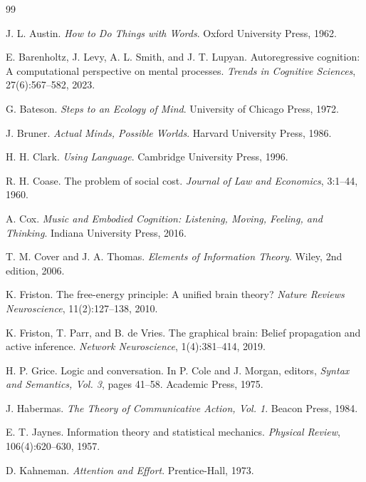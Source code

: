\documentclass[12pt]{article}
\theoremstyle{remark}
\begin{document}
\begin{thebibliography}{99}

J. L. Austin.
\newblock \emph{How to Do Things with Words}.
\newblock Oxford University Press, 1962.

E. Barenholtz, J. Levy, A. L. Smith, and J. T. Lupyan.
\newblock Autoregressive cognition: A computational perspective on mental processes.
\newblock \emph{Trends in Cognitive Sciences}, 27(6):567--582, 2023.

G. Bateson.
\newblock \emph{Steps to an Ecology of Mind}.
\newblock University of Chicago Press, 1972.

J. Bruner.
\newblock \emph{Actual Minds, Possible Worlds}.
\newblock Harvard University Press, 1986.

H. H. Clark.
\newblock \emph{Using Language}.
\newblock Cambridge University Press, 1996.

R. H. Coase.
\newblock The problem of social cost.
\newblock \emph{Journal of Law and Economics}, 3:1--44, 1960.

A. Cox.
\newblock \emph{Music and Embodied Cognition: Listening, Moving, Feeling, and Thinking}.
\newblock Indiana University Press, 2016.

T. M. Cover and J. A. Thomas.
\newblock \emph{Elements of Information Theory}.
\newblock Wiley, 2nd edition, 2006.

K. Friston.
\newblock The free-energy principle: A unified brain theory?
\newblock \emph{Nature Reviews Neuroscience}, 11(2):127--138, 2010.

K. Friston, T. Parr, and B. de Vries.
\newblock The graphical brain: Belief propagation and active inference.
\newblock \emph{Network Neuroscience}, 1(4):381--414, 2019.

H. P. Grice.
\newblock Logic and conversation.
\newblock In P. Cole and J. Morgan, editors, \emph{Syntax and Semantics, Vol. 3}, pages 41--58. Academic Press, 1975.

J. Habermas.
\newblock \emph{The Theory of Communicative Action, Vol. 1}.
\newblock Beacon Press, 1984.

E. T. Jaynes.
\newblock Information theory and statistical mechanics.
\newblock \emph{Physical Review}, 106(4):620--630, 1957.

D. Kahneman.
\newblock \emph{Attention and Effort}.
\newblock Prentice-Hall, 1973.


\end{thebibliography}
\end{document}
